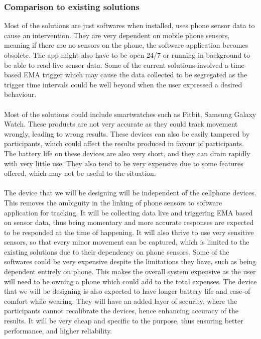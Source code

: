 \documentclass[12pt]{article}
\begin{document}
\subsubsection{Comparison to existing solutions}
Most of the solutions are just softwares when installed, uses phone sensor data to cause an intervention. They are very dependent on mobile phone sensors, meaning if there are no sensors on the phone, the software application becomes obsolete.
The app might also have to be open 24/7 or running in background to be able to read live sensor data.  Some of the current solutions involved a time-based EMA trigger
which may cause the data collected to be segregated as the trigger time intervals could be well beyond when the user expressed a desired behaviour.
\\\\
Most of the solutions could include smartwatches such as Fitbit, Samsung Galaxy Watch. These products are not very accurate as they could track movement wrongly, leading to wrong results.
These devices can also be easily tampered by participants, which could affect the results produced in favour of participants. The battery life on these devices are also very short, and they can drain rapidly with very little use.
They also tend to be very expensive due to some features offered, which may not be useful to the situation.
\\\\
The device that we will be designing will be independent of the cellphone devices. This removes the ambiguity in the linking of phone sensors to software application for tracking. It will be collecting data live and triggering EMA based on sensor data, thus being momentary and
more accurate responses are expected to be responded at the time of happening. It will also thrive to use very sensitive sensors, so that every minor movement can be captured, which is limited to the existing solutions due to their dependency on phone sensors.
Some of the softwares could be very expensive despite the limitations they have, such as being dependent entirely on phone. This makes the overall system expensive as the user will need
to be owning a phone which could add to the total expenses. The device that we will be designing is also expected to have longer battery life and ease-of-comfort while wearing. They will have an added layer of security, where the participants cannot recalibrate the devices, hence enhancing accuracy of the results.
It will be very cheap and specific to the purpose, thus ensuring better performance, and higher reliability.
\end{document}
